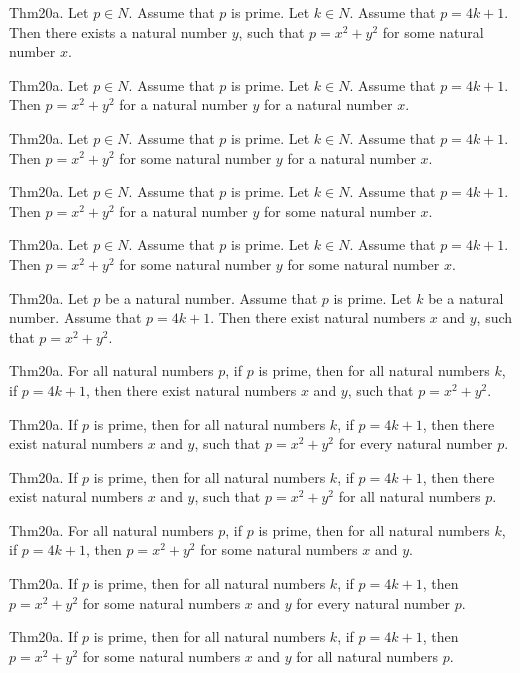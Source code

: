 \documentclass{article}
\begin{document}
Thm20a. Let $p \in N$. Assume that $p$ is prime. Let $k \in N$. Assume that $p = 4 k + 1$. Then there exists a natural number $y$, such that $p = x ^{ 2}+ y ^{ 2}$ for some natural number $x$.

Thm20a. Let $p \in N$. Assume that $p$ is prime. Let $k \in N$. Assume that $p = 4 k + 1$. Then $p = x ^{ 2}+ y ^{ 2}$ for a natural number $y$ for a natural number $x$.

Thm20a. Let $p \in N$. Assume that $p$ is prime. Let $k \in N$. Assume that $p = 4 k + 1$. Then $p = x ^{ 2}+ y ^{ 2}$ for some natural number $y$ for a natural number $x$.

Thm20a. Let $p \in N$. Assume that $p$ is prime. Let $k \in N$. Assume that $p = 4 k + 1$. Then $p = x ^{ 2}+ y ^{ 2}$ for a natural number $y$ for some natural number $x$.

Thm20a. Let $p \in N$. Assume that $p$ is prime. Let $k \in N$. Assume that $p = 4 k + 1$. Then $p = x ^{ 2}+ y ^{ 2}$ for some natural number $y$ for some natural number $x$.

Thm20a. Let $p$ be a natural number. Assume that $p$ is prime. Let $k$ be a natural number. Assume that $p = 4 k + 1$. Then there exist natural numbers $x$ and $y$, such that $p = x ^{ 2}+ y ^{ 2}$.

Thm20a. For all natural numbers $p$, if $p$ is prime, then for all natural numbers $k$, if $p = 4 k + 1$, then there exist natural numbers $x$ and $y$, such that $p = x ^{ 2}+ y ^{ 2}$.

Thm20a. If $p$ is prime, then for all natural numbers $k$, if $p = 4 k + 1$, then there exist natural numbers $x$ and $y$, such that $p = x ^{ 2}+ y ^{ 2}$ for every natural number $p$.

Thm20a. If $p$ is prime, then for all natural numbers $k$, if $p = 4 k + 1$, then there exist natural numbers $x$ and $y$, such that $p = x ^{ 2}+ y ^{ 2}$ for all natural numbers $p$.

Thm20a. For all natural numbers $p$, if $p$ is prime, then for all natural numbers $k$, if $p = 4 k + 1$, then $p = x ^{ 2}+ y ^{ 2}$ for some natural numbers $x$ and $y$.

Thm20a. If $p$ is prime, then for all natural numbers $k$, if $p = 4 k + 1$, then $p = x ^{ 2}+ y ^{ 2}$ for some natural numbers $x$ and $y$ for every natural number $p$.

Thm20a. If $p$ is prime, then for all natural numbers $k$, if $p = 4 k + 1$, then $p = x ^{ 2}+ y ^{ 2}$ for some natural numbers $x$ and $y$ for all natural numbers $p$.
\end{document}
